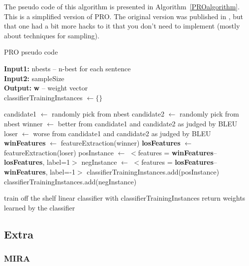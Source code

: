 The pseudo code of this algorithm is presented in Algorithm~\ref{PROalgorithm}. This is a simplified version of PRO. The original version was published in \cite{Hopkins:2011:TR:2145432.2145575}, but that one had a bit more hacks to it that you don't need to implement (mostly about techniques for sampling).

\begin{algorithm}
\caption{PRO pseudo code}
\label{PROalgorithm}
\begin{algorithmic}

 \STATE \textbf{Input1: } nbests -- n-best for each sentence \\
 \STATE \textbf{Input2: } sampleSize \\
 
 \STATE \textbf{Output: } \textbf{w} -- weight vector \\
 
 \STATE classifierTrainingInstances $\leftarrow \{\}$
 

   \STATE candidate1 $\leftarrow$ randomly pick from nbest
   \STATE candidate2 $\leftarrow$ randomly pick from nbest
   \STATE winner $\leftarrow$ better from candidate1 and candidate2 as judged by BLEU
   \STATE loser $\leftarrow$ worse from candidate1 and candidate2 as judged by BLEU
   \STATE \textbf{winFeatures} $\leftarrow$ featureExtraction(winner)
   \STATE \textbf{losFeatures} $\leftarrow$ featureExtraction(loser)
   \STATE posInstance $\leftarrow$ $<$features = \textbf{winFeatures}--\textbf{losFeatures}, label=1$>$
   \STATE negInstance $\leftarrow$ $<$features = \textbf{losFeatures}--\textbf{winFeatures}, label=-1$>$
   \STATE classifierTrainingInstances.add(posInstance)
   \STATE classifierTrainingInstances.add(negInstance)
  \ENDFOR
  
 \ENDFOR
 
 \STATE train off the shelf linear classifier with classifierTrainingInstances
 \STATE return weights learned by the classifier
  
\end{algorithmic}
\end{algorithm}


\subsection{Extra}

\subsubsection{MIRA}

